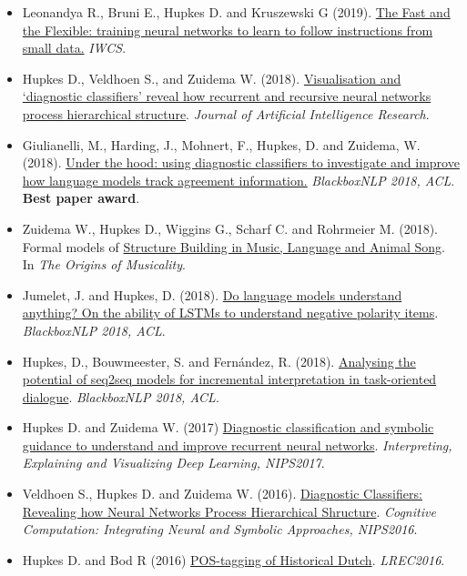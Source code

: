 \begin{itemize}
    \item Leonandya R., Bruni E., Hupkes D. and Kruszewski G (2019). \href{https://www.aclweb.org/anthology/W19-0419/}{The Fast and the Flexible: training neural networks to learn to follow instructions from small data.} \textit{IWCS}. 
    
    \item Hupkes D., Veldhoen S., and Zuidema W. (2018). \href{https://jair.org/index.php/jair/article/view/11196/26408}{Visualisation and ‘diagnostic classifiers’ reveal how recurrent and recursive neural networks process hierarchical structure}. \textit{Journal of Artificial Intelligence Research}.
    
    \item Giulianelli, M., Harding, J., Mohnert, F., Hupkes, D. and Zuidema, W. (2018). \href{https://aclweb.org/anthology/W18-5426}{Under the hood: using diagnostic classifiers to investigate and improve how language models track agreement information.} \textit{BlackboxNLP 2018, ACL}. \\ \textbf{Best paper award}.
    
    \item Zuidema W., Hupkes D., Wiggins G., Scharf C. and Rohrmeier M. (2018). Formal models of \href{https://arxiv.org/abs/1901.05180}{Structure Building in Music, Language and Animal Song}. In \textit{The Origins of Musicality}.
    
    \item Jumelet, J. and Hupkes, D. (2018). \href{https://aclweb.org/anthology/W18-5424}{Do language models understand anything? On the ability of LSTMs to understand negative polarity items}. \textit{BlackboxNLP 2018, ACL}.
    
    \item Hupkes, D., Bouwmeester, S. and Fernández, R. (2018). \href{https://aclweb.org/anthology/W18-5419}{Analysing the potential of seq2seq models for incremental interpretation in task-oriented dialogue}. \textit{BlackboxNLP 2018, ACL}.
    
    \item Hupkes D. and Zuidema W. (2017) \href{http://www.interpretable-ml.org/nips2017workshop/papers/12.pdf}{Diagnostic classification and symbolic guidance to understand and improve recurrent neural networks}. \textit{Interpreting, Explaining and Visualizing Deep Learning, NIPS2017}.
    
    \item Veldhoen S., Hupkes D. and Zuidema W. (2016). \href{http://dieuwkehupkes.nl/research/nips2016.pdf}{Diagnostic Classifiers: Revealing how Neural
Networks Process Hierarchical Shructure}. \textit{Cognitive Computation: Integrating Neural and
Symbolic Approaches, NIPS2016}.

    \item Hupkes D. and Bod R (2016) \href{https://www.aclweb.org/anthology/L16-1012}{POS-tagging of Historical Dutch}. \textit{LREC2016}.
\end{itemize}

